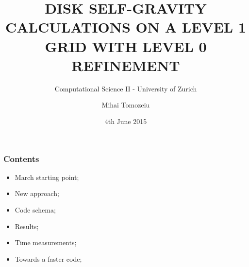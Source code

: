 \documentclass{beamer}
\title{DISK SELF-GRAVITY CALCULATIONS ON A LEVEL 1 GRID WITH LEVEL 0 REFINEMENT}
\subtitle{Computational Science II - University of Zurich}
\author{Mihai Tomozeiu}
\date{4th June 2015}
\begin{document}
\maketitle

\begin{frame}
 \frametitle{Contents}
\begin{itemize}
\item March starting point;
\item New approach;
\item Code schema; 
\item Results; 
\item Time measurements;
\item Towards a faster code;
\end{itemize}






\end{frame}
\end{document}
